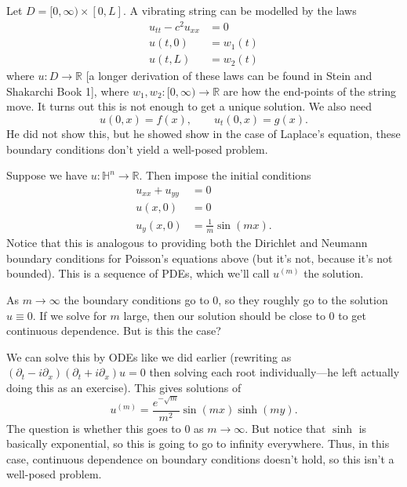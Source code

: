 \begin{example}
	Let \( D = [0, \infty) \times [0, L] \). A vibrating string can be modelled by the laws
	\begin{align*}
		u_{tt} - c^{2} u_{x x} &= 0 \\
		u(t, 0) &= w_{1}(t) \\
		u(t, L) &= w_{2}(t)
	\end{align*}
	where \( u : D \to \mathbb{R} \) [a longer derivation of these laws can be found in Stein and Shakarchi Book 1], where \( w_{1}, w_{2} : [0, \infty) \to \mathbb{R} \) are how the end-points of the string move. It turns out this is not enough to get a unique solution. We also need
	\[ u(0, x) = f(x), \qquad u_{t}(0, x) = g(x). \]
	He did not show this, but he showed show in the case of Laplace's equation, these boundary conditions don't yield a well-posed problem.
\end{example}

\begin{example}
	Suppose we have \( u : \mathbb{H}^{n} \to \mathbb{R} \). Then impose the initial conditions
	\begin{align*}
		u_{x x} + u_{y y} &= 0 \\
		u(x, 0) &= 0 \\
		u_{y}(x, 0) &= \frac{1}{m} \sin(mx).
	\end{align*}
	Notice that this is analogous to providing both the Dirichlet and Neumann boundary conditions for Poisson's equations above (but it's not, because it's not bounded). This is a sequence of PDEs, which we'll call \( u^{(m)} \) the solution. 

	As \( m \to \infty \) the boundary conditions go to \( 0 \), so they roughly go to the solution \( u \equiv 0 \). If we solve for \( m \) large, then our solution should be close to \( 0 \) to get continuous dependence. But is this the case?

	We can solve this by ODEs like we did earlier (rewriting as \( (\partial_{t} - i \partial_{x})(\partial_{t} + i \partial_{x}) u = 0 \) then solving each root individually---he left actually doing this as an exercise). This gives solutions of 
	\[ u^{(m)} = \frac{e^{- \sqrt{ m}}}{m^{2}} \sin(mx) \sinh(m y). \]
	The question is whether this goes to \( 0 \) as \( m \to \infty \). But notice that \( \sinh \) is basically exponential, so this is going to go to infinity everywhere. Thus, in this case, continuous dependence on boundary conditions doesn't hold, so this isn't a well-posed problem.
\end{example}

